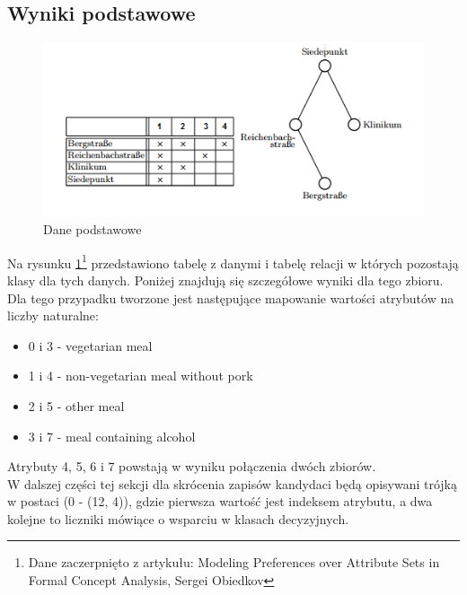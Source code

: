 \documentclass[a4paper,12pt]{article}
\begin{document}
\subsection{Wyniki podstawowe}

\begin{figure}[h!]
\begin{center}
\includegraphics[width=\textwidth]{img/dane.png}
\caption{Dane podstawowe}
\label{dane_podstawowe}
\end{center}
\end{figure}

Na rysunku \ref{dane_podstawowe}\footnote{Dane zaczerpnięto z artykułu: Modeling Preferences over Attribute Sets in
Formal Concept Analysis, Sergei Obiedkov} przedstawiono tabelę z danymi i tabelę relacji w których pozostają klasy dla tych danych. Poniżej znajdują się szczegółowe wyniki dla tego zbioru.\\

Dla tego przypadku tworzone jest następujące mapowanie wartości atrybutów na liczby naturalne:\\

\begin{itemize}
\item 0 i 3 - vegetarian meal
\item 1 i 4 - non-vegetarian meal without pork
\item 2 i 5 - other meal
\item 3 i 7 - meal containing alcohol
\end{itemize}

Atrybuty 4, 5, 6 i 7 powstają w wyniku połączenia dwóch zbiorów.\\

W dalszej części tej sekcji dla skrócenia zapisów kandydaci będą opisywani trójką w postaci (0 - (12, 4)), gdzie pierwsza wartość jest indeksem atrybutu, a dwa kolejne to liczniki mówiące o wsparciu w klasach decyzyjnych.
\end{document}
